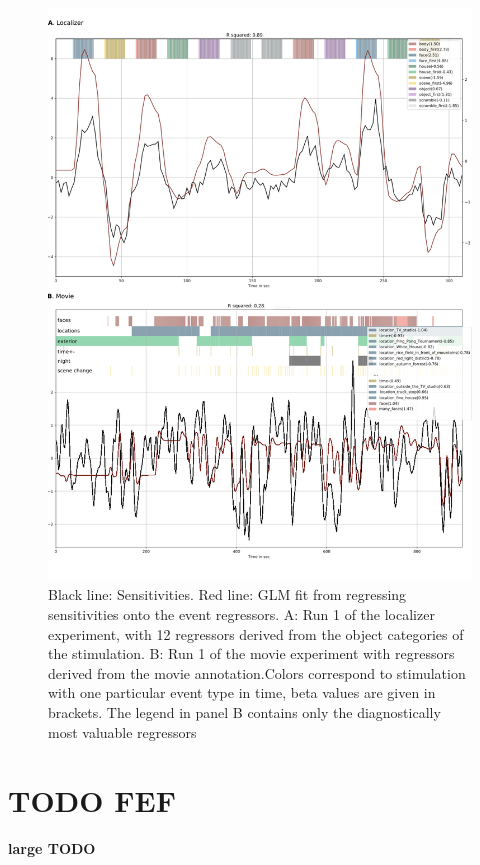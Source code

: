 \documentclass[a4paper, 12pt]{scrreprt}
\begin{document}
\begin{figure}
	\includegraphics[scale=0.4]{img/sens_timecourse.png}
	\caption[Functional specificity of ROIs in two validation analyses.]{\small{Black line: Sensitivities. Red line: GLM fit from regressing sensitivities onto the event regressors. A: Run 1 of the localizer experiment, with 12 regressors derived from the object categories of the stimulation. B: Run 1 of the movie experiment with regressors derived from the movie annotation.\newline Colors correspond to stimulation with one particular event type in time, beta values are given in brackets. The legend in panel B contains only the diagnostically most valuable regressors}}
	\label{fig:locsens}
\end{figure}
\section{TODO FEF}\label{section:results_FEF}
\textbf{large TODO}
\end{document}
